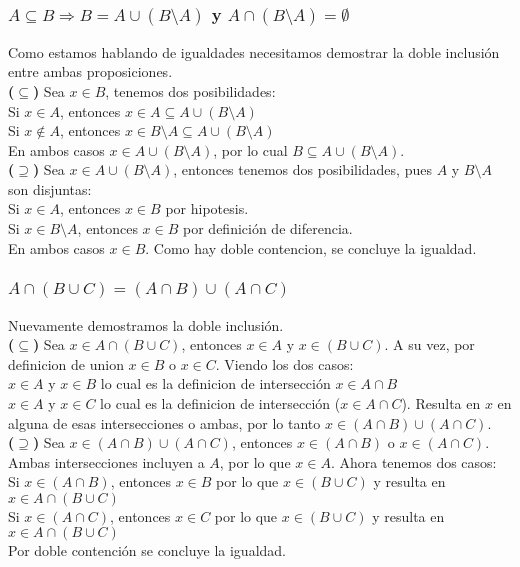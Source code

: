 \documentclass[a4paper]{article}
\begin{document}
\subsubsection{$A \subseteq B \Rightarrow B=A\cup (B\setminus A)$ y $A\cap(B\setminus A)=\emptyset$}
Como estamos hablando de igualdades necesitamos demostrar la doble inclusión entre ambas proposiciones.\\
\textbf{($\subseteq$)} Sea $x \in B$, tenemos dos posibilidades:\\
Si $x \in A$, entonces $x \in A \subseteq A\cup (B\setminus A)$\\
Si $x \notin A$, entonces $x \in B\setminus A \subseteq A\cup (B\setminus A)$\\
En ambos casos $x \in A\cup (B\setminus A)$, por lo cual $B \subseteq A\cup (B\setminus A)$.\\
\textbf{($\supseteq$)} Sea $x \in A\cup (B\setminus A)$, entonces tenemos dos posibilidades, pues $A$ y $B\setminus A$ son disjuntas:\\
Si $x \in A$, entonces $x \in B$ por hipotesis.\\
Si $x \in B\setminus A$, entonces $x \in B$ por definición de diferencia.\\
En ambos casos $x \in B$. Como hay doble contencion, se concluye la igualdad.

\subsubsection{$A\cap (B\cup C)=(A\cap B)\cup(A\cap C)$}
Nuevamente demostramos la doble inclusión.\\
\textbf{($\subseteq$)} Sea $x \in A\cap (B\cup C)$, entonces $x \in A$ y $x \in (B\cup C)$. A su vez, por definicion de union $x \in B$ o $x \in C$. Viendo los dos casos:\\
$x \in A$ y $x \in B$ lo cual es la definicion de intersección $x \in A\cap B$\\
$x \in A$ y $x \in C$ lo cual es la definicion de intersección ($x \in A\cap C$). Resulta en $x$ en alguna de esas intersecciones o ambas, por lo tanto $x \in (A\cap B)\cup(A\cap C)$.\\
\textbf{($\supseteq$)} Sea $x \in (A\cap B)\cup(A\cap C)$, entonces $x \in (A\cap B)$ o $x \in (A\cap C)$. Ambas intersecciones incluyen a $A$, por lo que $x \in A$. Ahora tenemos dos casos:\\
Si $x \in (A\cap B)$, entonces $x \in B$ por lo que $x \in (B\cup C)$ y resulta en $x \in A\cap (B\cup C)$\\
Si $x \in (A\cap C)$, entonces $x \in C$ por lo que $x \in (B\cup C)$ y resulta en $x \in A\cap (B\cup C)$\\
Por doble contención se concluye la igualdad.
\end{document}
